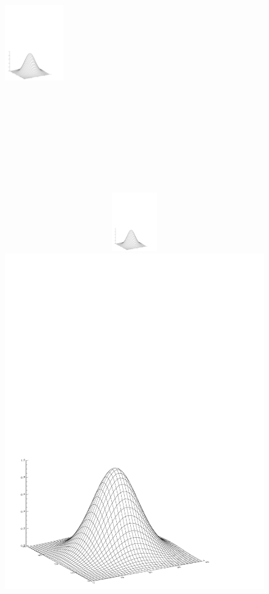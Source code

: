 \documentclass[12pt,preprint]{aastex}
\begin{document}
\begin{figure} [!p]
\begin{center}
\includegraphics[width=1in,height=5in]{2dgaussian.pdf}
\includegraphics[width=5in,height=1in,angle=180]{2dgaussian.pdf}
\includegraphics[scale=0.1,angle=45]{2dgaussian.pdf}

\end{center}
\end{figure}
\end{document}
